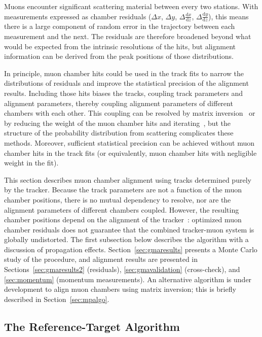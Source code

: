 \documentclass[11pt,twoside,a4paper,cmspaper]{cms-tdr}
\begin{document}
Muons encounter significant scattering material between every two
stations.  With measurements expressed as chamber residuals
($\Delta x$, $\Delta y$, $\Delta \frac{\textrm{d}x}{\textrm{d}z}$,
$\Delta \frac{\textrm{d}y}{\textrm{d}z}$), this means there is a large component of
random error in the trajectory between each measurement and the next.
The residuals are therefore broadened beyond what would be expected
from the intrinsic resolutions of the hits, but alignment information
can be derived from the peak positions of those distributions.

In principle, muon chamber hits could be used in the track fits to
narrow the distributions of residuals and improve the statistical
precision of the alignment results.  Including those hits biases the tracks,
coupling track parameters and alignment parameters, thereby coupling
alignment parameters of different chambers with each other.  This coupling can be
resolved by matrix inversion~\cite{Blobel:2006yh} or by reducing the
weight of the muon chamber hits and iterating~\cite{Karimaki:2003bd}, but
the structure of the probability distribution from scattering
complicates these methods.  Moreover, sufficient statistical precision
can be achieved without muon chamber hits in the track fits (or
equivalently, muon chamber hits with negligible weight in the fit).

This section describes muon chamber alignment using tracks
determined purely by the tracker.  Because the track parameters are
not a function of the muon chamber positions, there is no mutual
dependency to resolve, nor are the alignment parameters of different
chambers coupled.  However, the resulting chamber positions depend on
the alignment of the tracker~\cite{Collaboration:2009sr}: optimized
muon chamber residuals does not guarantee that the combined
tracker-muon system is globally undistorted.  The first subsection
below describes the algorithm with a discussion of propagation
effects.  Section~\ref{sec:gmaresults} presents a Monte Carlo study
of the procedure, and alignment results are presented in
Sections~\ref{sec:gmaresults2} (residuals),
\ref{sec:gmavalidation} (cross-check), and \ref{sec:momentum} (momentum measurements).
An alternative algorithm is under development to align muon chambers
using matrix inversion; this is briefly described in
Section~\ref{sec:mpalgo}.

\subsection{The Reference-Target Algorithm}
\label{sec:rtalgo}
\end{document}
